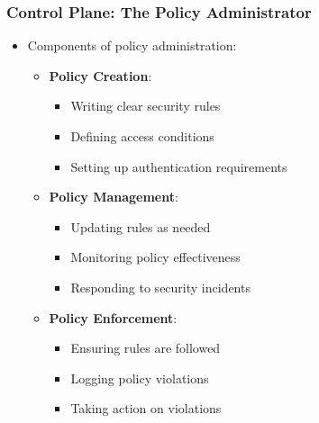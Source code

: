 \documentclass{beamer}
\begin{document}
\begin{frame}
    \frametitle{Control Plane: The Policy Administrator}
    \begin{itemize}
        \item Components of policy administration:
            \begin{itemize}
                \item \textbf{Policy Creation}:
                    \begin{itemize}
                        \item Writing clear security rules
                        \item Defining access conditions
                        \item Setting up authentication requirements
                    \end{itemize}
                \item \textbf{Policy Management}:
                    \begin{itemize}
                        \item Updating rules as needed
                        \item Monitoring policy effectiveness
                        \item Responding to security incidents
                    \end{itemize}
                \item \textbf{Policy Enforcement}:
                    \begin{itemize}
                        \item Ensuring rules are followed
                        \item Logging policy violations
                        \item Taking action on violations
                    \end{itemize}
            \end{itemize}
    \end{itemize}
\end{frame}
\end{document}
